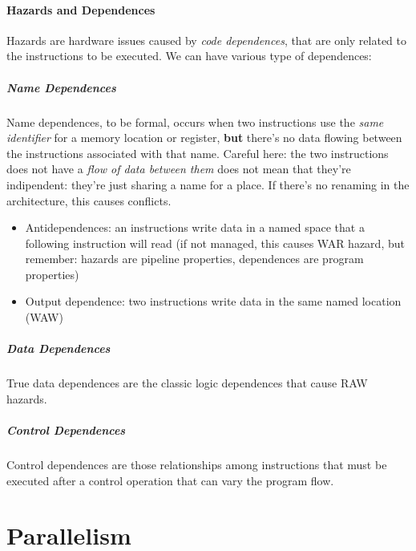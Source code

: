 \documentclass[10pt,a4paper]{article}
\begin{document}
			\subsection{Hazards and Dependences}
				Hazards are hardware issues caused by \emph{code dependences}, that are only related to the instructions to be executed. We can have various type of dependences:
				
				\subsubsection{Name Dependences}
					Name dependences, to be formal, occurs when two instructions use the \emph{same identifier} for a memory location or register, \textbf{but} there's no data flowing between the instructions associated with that name. Careful here: the two instructions does not have a \emph{flow of data between them} does not mean that they're indipendent: they're just sharing a name for a place. If there's no renaming in the architecture, this causes conflicts.
					\begin{itemize}
						\item Antidependences: an instructions write data in a named space that a following instruction will read (if not managed, this causes WAR hazard, but remember: hazards are pipeline properties, dependences are program properties)
						\item Output dependence: two instructions write data in the same named location (WAW)
					\end{itemize}					
					
				\subsubsection{Data Dependences}
					True data dependences are the classic logic dependences that cause RAW hazards.
				
				\subsubsection{Control Dependences}
					Control dependences are those relationships among instructions that must be executed after a control operation that can vary the program flow.
						
	\clearpage \part{Parallelism}
\end{document}
